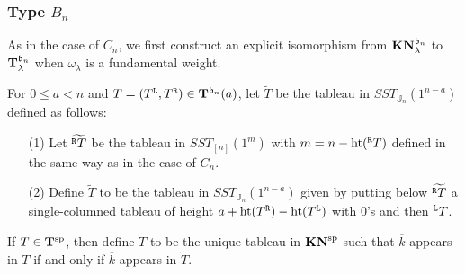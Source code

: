 \documentclass[leqno,11pt]{amsart}
\numberwithin{equation}{section}
\newcommand{\ov}{\overline}
\newcommand{\td}{\widetilde}
\newcommand{\mf}{\mathfrak}
\newcommand{\J}{\mathbb{J}}
\newcommand{\la}{\lambda}
\begin{document}
\subsubsection{Type $B_n$}
As in the case of $C_n$, we first construct an explicit isomorphism from ${\bf KN}^{\mf b_n}_{\la}$ to ${\bf T}^{\mf b_n}_{\la}$ when $\omega_\la$ is a fundamental weight.

For $0\leq a< n$ and $T=(T^{\tt L}, T^{\tt R})\in {\bf T}^{\mf b_n}(a)$, let $\td{T}$ be the tableau in $SST_{\J_n}(1^{n-a})$ defined as follows:
\begin{itemize}
\item[(1)] Let $\td{{}^{\tt R}T}$ be the tableau in $SST_{[n]}(1^m)$ with $m=n-{\rm ht}({}^{\tt R}T)$ defined in the same way as in the case of $C_n$.

\item[(2)] Define $\td{T}$ to be the tableau in $SST_{\J_n}(1^{n-a})$ given by putting below $\td{{}^{\tt R}T}$ a single-columned tableau of height $a+{\rm ht}(T^{\tt R})-{\rm ht}(T^{\tt L})$ with $0$'s and then ${}^{\tt L}T$.
\end{itemize}
If $T\in {\bf T}^{\rm sp}$, then define $\td{T}$ to be the unique tableau in ${\bf KN}^{\rm sp}$ such that 
$\ov{k}$ appears in $T$ if and only if $\ov{k}$ appears in $\td{T}$.
\end{document}
